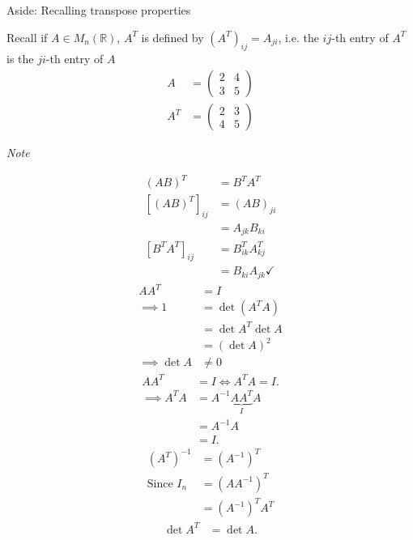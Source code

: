 \begin{aside}{Aside: Recalling transpose properties}

Recall if $A \in M_n(\mathbb{R})$, $A^T$ is defined by $(A^T)_{ij} = A_{ji}$, i.e. the $ij$-th entry of $A^T$ is the $ji$-th entry of $A$
\begin{align*}
    A &= \begin{pmatrix}2 & 4 \\3 & 5\end{pmatrix} \\
    A^T &= \begin{pmatrix}2 & 3 \\4 & 5\end{pmatrix}
\end{align*} 

\emph{Note}
\begin{enumerate}
    \mathitem \begin{align*}
        (AB)^T &= B^T A^T \\
        [(AB)^T]_{ij} &= (AB)_{ji} \\
        &= A_{jk}B_{ki} \\
        [B^T A^T]_{ij} &= B^T_{ik} A^T_{kj} \\
        &= B_{ki} A_{jk} \checkmark
    \end{align*} 
    \mathitem \begin{align*}
        A A^T &= I \\
        \implies 1 &= \det (A^T A) \\
        &= \det A^T \det A \\
        &= (\det A)^2 \\
        \implies \det A &\neq 0
    \end{align*}
    \mathitem \begin{align*}
        A A^T &= I \iff A^T A = I. \\
        \implies A^T A &= A^{-1} \underbrace{A A^T}_I A \\
        &= A^{-1} A \\
        &= I.
    \end{align*} 
    \mathitem \begin{align*}
        (A^T)^{-1} &= (A^{-1})^T \\
        \text{Since } I_n &= (A A^{-1})^T \\
        &= (A^{-1})^T A^T
    \end{align*} 
    \mathitem \begin{align*}
        \det A^T &= \det A.
    \end{align*} 
\end{enumerate} 

\end{aside}

